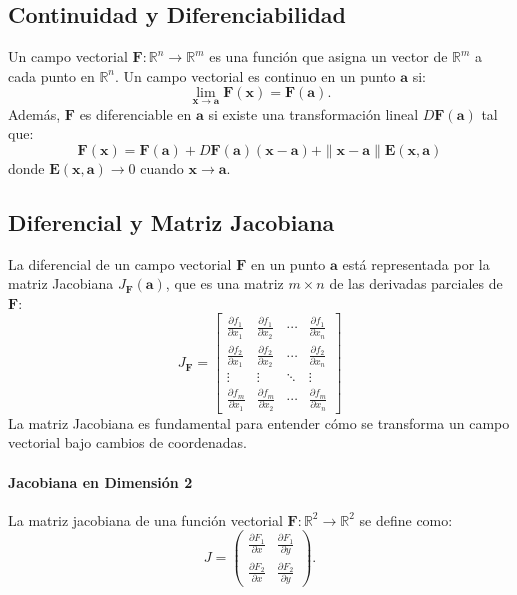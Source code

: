 \documentclass[11pt]{book}
\theoremstyle{definicion}
\theoremstyle{teorema}
\theoremstyle{ejemplo}
\begin{document}
\subsection{Continuidad y Diferenciabilidad}

Un campo vectorial \(\mathbf{F}: \mathbb{R}^n \to \mathbb{R}^m\) es una función que asigna un vector de \(\mathbb{R}^m\) a cada punto en \(\mathbb{R}^n\). Un campo vectorial es continuo en un punto \(\mathbf{a}\) si:
\[
\lim_{\mathbf{x} \to \mathbf{a}} \mathbf{F}(\mathbf{x}) = \mathbf{F}(\mathbf{a}).
\]
Además, \(\mathbf{F}\) es diferenciable en \(\mathbf{a}\) si existe una transformación lineal \(D\mathbf{F}(\mathbf{a})\) tal que:
\[
\mathbf{F}(\mathbf{x}) = \mathbf{F}(\mathbf{a}) + D\mathbf{F}(\mathbf{a})(\mathbf{x} - \mathbf{a}) + \|\mathbf{x} - \mathbf{a}\| \mathbf{E}(\mathbf{x}, \mathbf{a})
\]
donde \(\mathbf{E}(\mathbf{x}, \mathbf{a}) \to 0\) cuando \(\mathbf{x} \to \mathbf{a}\).

\subsection{Diferencial y Matriz Jacobiana}

La diferencial de un campo vectorial \(\mathbf{F}\) en un punto \(\mathbf{a}\) está representada por la matriz Jacobiana \(J_{\mathbf{F}}(\mathbf{a})\), que es una matriz \(m \times n\) de las derivadas parciales de \(\mathbf{F}\):
\[
J_{\mathbf{F}} = \begin{bmatrix}
\frac{\partial f_1}{\partial x_1} & \frac{\partial f_1}{\partial x_2} & \cdots & \frac{\partial f_1}{\partial x_n} \\
\frac{\partial f_2}{\partial x_1} & \frac{\partial f_2}{\partial x_2} & \cdots & \frac{\partial f_2}{\partial x_n} \\
\vdots & \vdots & \ddots & \vdots \\
\frac{\partial f_m}{\partial x_1} & \frac{\partial f_m}{\partial x_2} & \cdots & \frac{\partial f_m}{\partial x_n}
\end{bmatrix}
\]
La matriz Jacobiana es fundamental para entender cómo se transforma un campo vectorial bajo cambios de coordenadas.


\paragraph{Jacobiana en Dimensión 2}
La matriz jacobiana de una función vectorial \( \mathbf{F}: \mathbb{R}^2 \to \mathbb{R}^2 \) se define como:
\[ J = \begin{pmatrix} \frac{\partial F_1}{\partial x} & \frac{\partial F_1}{\partial y} \\ \frac{\partial F_2}{\partial x} & \frac{\partial F_2}{\partial y} \end{pmatrix}. \]
\end{document}
